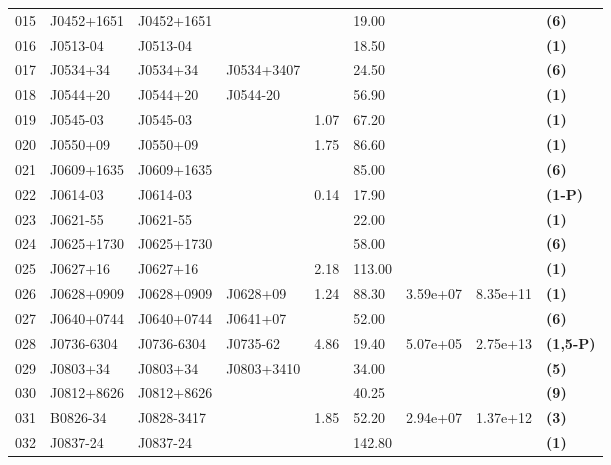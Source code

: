 \documentclass{jaa}
\begin{document}
\begin{table*}
\begin{minipage}{0.95\textwidth}
\begin{tabular}{|l|l|l|l|l|l|l|l|l|}
 015 & J0452+1651  & J0452+1651  &             &       &  19.00 &            &          &  {\bf (6)}   \\
 016 & J0513-04    & J0513-04    &             &       &  18.50 &            &          &  {\bf (1)}   \\
 017 & J0534+34    & J0534+34    & J0534+3407  &       &  24.50 &            &          &  {\bf (6)}   \\
 018 & J0544+20    & J0544+20    & J0544-20    &       &  56.90 &            &          &  {\bf (1)}   \\
 019 & J0545-03    & J0545-03    &             &  1.07 &  67.20 &            &          &  {\bf (1)}   \\
 020 & J0550+09    & J0550+09    &             &  1.75 &  86.60 &            &          &  {\bf (1)}   \\
 021 & J0609+1635  & J0609+1635  &             &       &  85.00 &            &          &  {\bf (6)}   \\
 022 & J0614-03    & J0614-03	 &             &  0.14 &  17.90 &            &          &  {\bf (1-P)} \\ 
 023 & J0621-55    & J0621-55    &             &       &  22.00 &            &          &  {\bf (1)}   \\
 024 & J0625+1730  & J0625+1730  &             &       &  58.00 &            &          &  {\bf (6)}   \\
 025 & J0627+16    & J0627+16    &             &  2.18 & 113.00 &            &          &  {\bf (1)}   \\
 026 & J0628+0909  & J0628+0909  &  J0628+09   &  1.24 &  88.30 &  3.59e+07  & 8.35e+11 &  {\bf (1)}   \\
 027 & J0640+0744  & J0640+0744  &  J0641+07   &       &  52.00 &            &          &  {\bf (6)}   \\ 
 028 & J0736-6304  & J0736-6304  &  J0735-62   &  4.86 &  19.40 &  5.07e+05  & 2.75e+13 &  {\bf (1,5-P)} \\
 029 & J0803+34    & J0803+34    &  J0803+3410 &       &  34.00 &            &          &  {\bf (5)}   \\
 030 & J0812+8626  & J0812+8626  &             &       &  40.25 &            &          &  {\bf (9)}   \\
 031 & B0826-34    & J0828-3417  &             & 1.85  & 52.20  &  2.94e+07  & 1.37e+12 &  {\bf (3)}   \\
 032 & J0837-24    & J0837-24    &             &       & 142.80 &            &          &  {\bf (1)}   \\

\end{tabular}
\end{minipage}
\end{table*}
\end{document}
